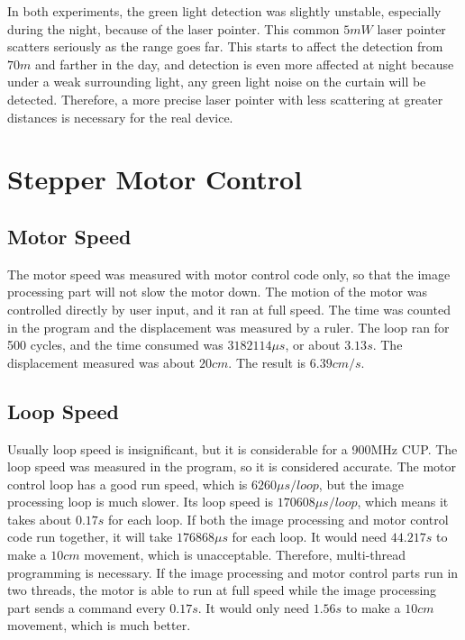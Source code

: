 In both experiments, the green light detection was slightly unstable, especially during the night, because of the laser pointer. This common $5mW$ laser pointer scatters seriously as the range goes far. This starts to affect the detection from $70m$ and farther in the day, and detection is even more affected at night because under a weak surrounding light, any green light noise on the curtain will be detected. Therefore, a more precise laser pointer with less scattering at greater distances is necessary for the real device.

\section{Stepper Motor Control}



\subsection{Motor Speed}

The motor speed was measured with motor control code only, so that the image processing part will not slow the motor down. The motion of the motor was controlled directly by user input, and it ran at full speed. The time was counted in the program and the displacement was measured by a ruler. The loop ran for 500 cycles, and the time consumed was $3182114\mu s$, or about $3.13s$. The displacement measured was about $20cm$. The result is $6.39cm/s$.  

\subsection{Loop Speed}

Usually loop speed is insignificant, but it is considerable for a 900MHz CUP. The loop speed was measured in the program, so it is considered accurate. The motor control loop has a good run speed, which is $6260\mu s/loop$, but the image processing loop is much slower. Its loop speed is $170608\mu s/loop$, which means it takes about $0.17s$ for each loop. If both the image processing and motor control code run together, it will take $176868\mu s$ for each loop. It would need $44.217s$ to make a $10cm$ movement, which is unacceptable. Therefore, multi-thread programming is necessary. If the image processing and motor control parts run in two threads, the motor is able to run at full speed while the image processing part sends a command every $0.17s$. It would only need $1.56s$ to make a $10cm$ movement, which is much better.

